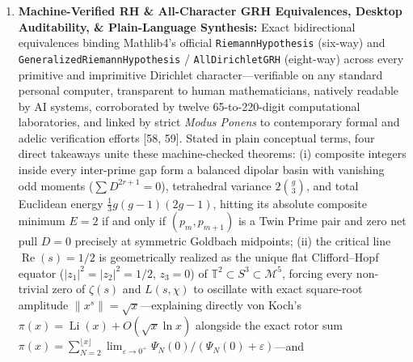 \documentclass[
  11pt,
]{article}
\begin{document}
\begin{enumerate}
  induction (\(S = A^T A\)); explicit golden-ratio icosian
  \(\Gamma_{120}\) vertices (\(2\cos(\pi/5)=\varphi\)) on \(S^3\),
  Hurwitz--KAM Diophantine spiral non-resonance on
  \(\mathbb{T}^2 \subset \mathcal{M}^5\) {[}60{]}, and primitive
  quadratic character \(\chi_5\) (\(L(1,\chi_5)\ne 0\)); stereographic
  North-Pole compactification \(\theta(L) = 2\arctan(L) \to \pi\) on
  \(S^3 \subset \mathcal{M}^5\), topological closedness of the PSD cone
  under quadratic limits (\(\lambda_{\min} \to 0^+\)), kinetic boundary
  confinement \([1/(2M), 1 - 1/(2M)]\), and the
  Reparametrization-Invariance No-Go Theorem paired with spectrally
  preconditioned congruence rescue (\(S_L = B_L^T \widetilde{S}_L B_L\))
  reducing all-horizon Gram closure strictly to a finite relative decay
  bound \(\tilde{\mu}'(\theta) \ge -C\tilde{\mu}(\theta)\) on
  \((0, \pi)\) {[}61{]}.
\item
  \textbf{Machine-Verified RH \& All-Character GRH Equivalences, Desktop
  Auditability, \& Plain-Language Synthesis:} Exact bidirectional
  equivalences binding Mathlib4's official \texttt{RiemannHypothesis}
  (six-way) and \texttt{GeneralizedRiemannHypothesis} /
  \texttt{AllDirichletGRH} (eight-way) across every primitive and
  imprimitive Dirichlet character---verifiable on any standard personal
  computer, transparent to human mathematicians, natively readable by AI
  systems, corroborated by twelve 65-to-220-digit computational
  laboratories, and linked by strict \emph{Modus Ponens} to contemporary
  formal and adelic verification efforts {[}58, 59{]}. Stated in plain
  conceptual terms, four direct takeaways unite these machine-checked
  theorems: (i) composite integers inside every inter-prime gap form a
  balanced dipolar basin with vanishing odd moments
  (\(\sum D^{2r+1} = 0\)), tetrahedral variance \(2\binom{g}{3}\), and
  total Euclidean energy \(\frac{1}{3}g(g-1)(2g-1)\), hitting its
  absolute composite minimum \(E = 2\) if and only if \((p_m, p_{m+1})\)
  is a Twin Prime pair and zero net pull \(D = 0\) precisely at
  symmetric Goldbach midpoints; (ii) the critical line
  \(\operatorname{Re}(s) = 1/2\) is geometrically realized as the unique
  flat Clifford--Hopf equator (\(|z_1|^2 = |z_2|^2 = 1/2\), \(z_3 = 0\))
  of \(\mathbb{T}^2 \subset S^3 \subset \mathcal{M}^5\), forcing every
  non-trivial zero of \(\zeta(s)\) and \(L(s, \chi)\) to oscillate with
  exact square-root amplitude \(\|x^s\| = \sqrt{x}\)---explaining
  directly von Koch's
  \(\pi(x) = \operatorname{Li}(x) + O(\sqrt{x}\ln x)\) alongside the
  exact rotor sum
  \(\pi(x) = \sum_{N=2}^{\lfloor x\rfloor}\lim_{\varepsilon\to 0^+}\Psi_N(0)/(\Psi_N(0)+\varepsilon)\)---and

\end{enumerate}
\end{document}
